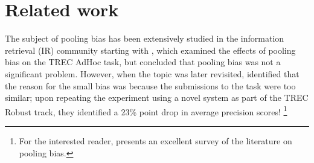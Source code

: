 \section{Related work}
\label{sec:kbpo:related}

The subject of pooling bias has been extensively studied in the information retrieval (IR) community starting with \citet{zobel1998reliable}, which examined the effects of pooling bias on the TREC AdHoc task, but concluded that pooling bias was not a significant problem. %
However, when the topic was later revisited,
\citet{buckley2007bias} identified that the reason for the small bias was because the submissions to the task were too similar; upon repeating the experiment using a novel system as part of the TREC Robust track, they identified a 23\% point drop in average precision scores!%
\footnote{For the interested reader, \citet{webber2010measurement} presents an excellent survey of the literature on pooling bias.}

